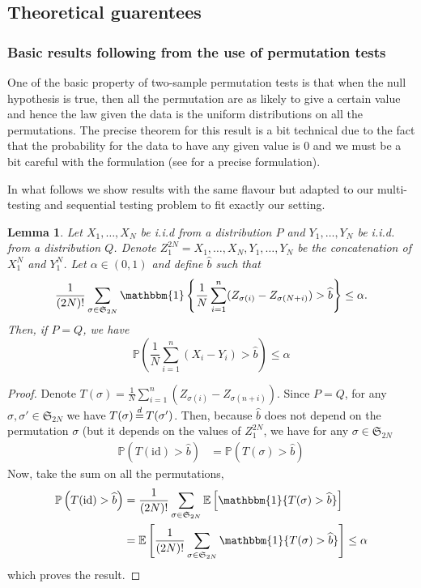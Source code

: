 \documentclass{article}
\theoremstyle{plain}
\newtheorem{Lemma}{Lemma}
\theoremstyle{remark}
\renewcommand{\P}{\mathbb{P}}
\newcommand{\E}{\mathbb{E}}
\renewcommand{\S}{\mathfrak{S}}
\newcommand{\1}{\mathbbm{1}}
\newcommand{\id}{\mathrm{id}}
\newcommand{\dec}{\,{\buildrel d \over =}\,}
\newcommand{\todoT}[1]{\todo[inline,color=blue!40]{{\textbf{T:}~}#1}}
\numberwithin{equation}{section}
\begin{document}
\newpage

\subsection{Theoretical guarentees}
\subsubsection{Basic results following from the use of permutation tests}
One of the basic property of two-sample permutation tests is that when the null hypothesis is true, then all the permutation are as likely to give a certain value and hence the law given the data is the uniform distributions on all the permutations. The precise theorem for this result is a bit technical due to the fact that the probability for the data to have any given value is $0$ and we must be a bit careful with the formulation (see \cite[Theorem 17.2.2]{lehmann2005testing} for a precise formulation). 

In what follows we show results with the same flavour but adapted to our multi-testing and sequential testing problem to fit exactly our setting.
\begin{Lemma}\label{lem:quantile_permu_2}
Let $X_1,\dots,X_N$ be i.i.d from a distribution $P$ and $Y_1,\dots,Y_N$ be i.i.d. from a distribution $Q$. Denote $Z_1^{2N}=X_1,\dots,X_N,Y_1,\dots,Y_N$ be the concatenation of $X_1^N$ and $Y_1^N$. Let $\alpha \in (0,1)$ and define $\widehat{b}$ such that 
$$ \frac{1}{(2N)!}\sum_{\sigma\in \S_{2N}} \1\left\{ \frac{1}{N}\sum_{i=1}^n (Z_{\sigma(i)}-Z_{\sigma(N+i)}) > \widehat{b}\right\}\le \alpha.$$
Then, if $P=Q$, we have 
$$\P\left(\frac{1}{N}\sum_{i=1}^n (X_i-Y_i) >\widehat{b} \right)\le \alpha $$ 
\end{Lemma}
\begin{proof}
Denote $T(\sigma)= \frac{1}{N}\sum_{i=1}^n (Z_{\sigma(i)}-Z_{\sigma(n+i)})$. Since $P=Q$, for any $\sigma,\sigma' \in \S_{2N}$ we have $T(\sigma)\dec T(\sigma')$. Then, because $\widehat{b}$ does not depend on the permutation $\sigma$ (but it depends on the values of $Z_1^{2N}$, we have for any $\sigma \in \S_{2N}$
\begin{align*}
\P\left(T(\id)> \widehat{b}\right)&=\P\left(T(\sigma)> \widehat{b}\right)
\end{align*} 
Now, take the sum on all the permutations, 
\begin{align*}
\P\left(T(\id)> \widehat{b}\right)&=\frac{1}{(2N)!}\sum_{\sigma\in \S_{2N}} \E\left[\1\{T(\sigma)> \widehat{b}\}\right]\\
&=  \E\left[\frac{1}{(2N)!}\sum_{\sigma\in \S_{2N}}\1\{T(\sigma)> \widehat{b}\}\right]\le \alpha
\end{align*}
which proves the result.
\end{proof}
\end{document}
